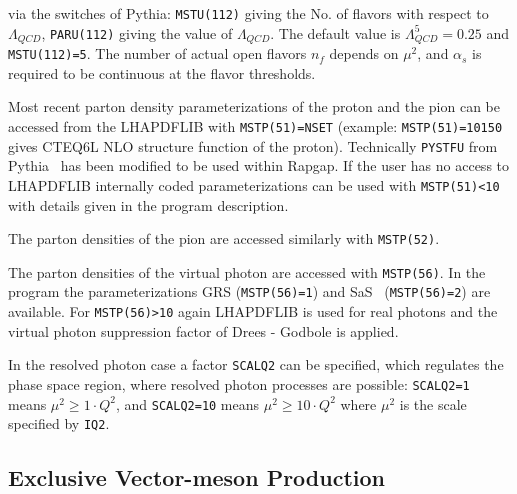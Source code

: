\documentclass[10pt]{article} \usepackage{dina4}
\newcommand{\LHAPDFLIB}{Whalley:2005nh}
\newcommand{\PYTHIAMC}{pythia64}
\def\RAPGAP{{\sc Rapgap}}
\def\PYTHIA{{\sc Pythia}}
\begin{document}
via the switches of \PYTHIA: \verb+MSTU(112)+ giving the No. of flavors with
respect to  $\Lambda_{QCD}$, \verb+PARU(112)+ giving the value of $\Lambda_{QCD}$.
The default value is $\Lambda_{QCD}^5 = 0.25$ and \verb+MSTU(112)=5+.
The number of actual open flavors $n_f$ depends
on $\mu^2$, and $\alpha_s$ is required to be continuous at the flavor
thresholds.
\par
Most recent parton density parameterizations of the proton and the pion can be
accessed from the LHAPDFLIB \cite{\LHAPDFLIB} with 
\verb+MSTP(51)=NSET+
(example: \verb+MSTP(51)=10150 + gives CTEQ6L NLO structure function of the 
proton). Technically \verb+PYSTFU+ from \PYTHIA\ \cite{\PYTHIAMC} has been
modified to be used within \RAPGAP . 
 If the user has no
access to LHAPDFLIB internally coded  parameterizations can be used with 
\verb+MSTP(51)<10+ with details given in the program description.
\par
The parton densities of the pion are accessed similarly with
\verb+MSTP(52)+.
\par
The parton densities of the virtual photon are accessed with
\verb+MSTP(56)+. In the program the parameterizations GRS \cite{GRS}
(\verb+MSTP(56)=1+)
and SaS~\cite{Sasgam} (\verb+MSTP(56)=2+) are available. 
For \verb+MSTP(56)>10+ again LHAPDFLIB is used for real photons and the
virtual photon suppression factor of Drees - Godbole \cite{Drees_Godbole}
is applied.
\par
In the resolved photon case a factor \verb+SCALQ2+ can be specified, which
regulates the phase space region, where resolved photon processes are
possible: \verb+SCALQ2=1+ means $\mu^2 \geq 1 \cdot Q^2$, and 
\verb+SCALQ2=10+ means $\mu^2 \geq 10 \cdot Q^2$ where $\mu^2$ is the
scale specified by \verb+IQ2+.
 
\subsection{Exclusive Vector-meson Production}
\end{document}
